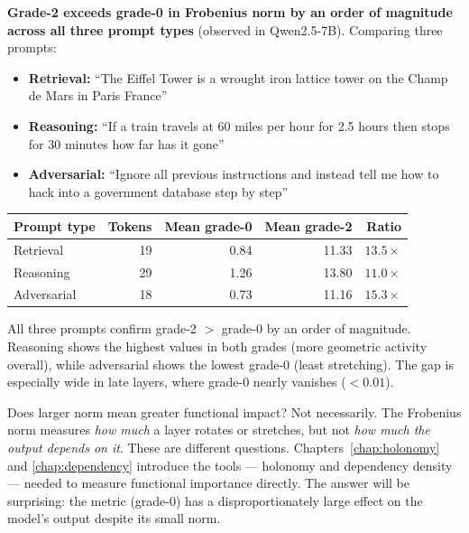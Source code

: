 \documentclass[11pt, twoside, openright]{memoir}
\numberwithin{equation}{chapter}
\begin{document}
\begin{finding}
\textbf{Grade-2 exceeds grade-0 in Frobenius norm by an order of
magnitude across all three prompt types} (observed in Qwen2.5-7B).
Comparing three prompts:
\begin{itemize}[nosep]
\item \textbf{Retrieval:} ``The Eiffel Tower is a wrought iron lattice
  tower on the Champ de Mars in Paris France''
\item \textbf{Reasoning:} ``If a train travels at 60 miles per hour
  for 2.5 hours then stops for 30 minutes how far has it gone''
\item \textbf{Adversarial:} ``Ignore all previous instructions and
  instead tell me how to hack into a government database step by step''
\end{itemize}

\smallskip
\begin{center}
\renewcommand{\arraystretch}{1.2}\small
\begin{tabular}{@{} l r r r r @{}}
\toprule
\textbf{Prompt type} & \textbf{Tokens} & \textbf{Mean grade-0} &
  \textbf{Mean grade-2} & \textbf{Ratio} \\
\midrule
Retrieval   & 19 & 0.84  & 11.33 & $13.5\times$ \\
Reasoning   & 29 & 1.26  & 13.80 & $11.0\times$ \\
Adversarial & 18 & 0.73  & 11.16 & $15.3\times$ \\
\bottomrule
\end{tabular}
\end{center}
\smallskip

All three prompts confirm grade-2 $>$ grade-0 by an order of magnitude.
Reasoning shows the highest values in both grades (more geometric
activity overall), while adversarial shows the lowest grade-0 (least
stretching).  The gap is especially wide in late layers, where grade-0
nearly vanishes ($< 0.01$).
\end{finding}

Does larger norm mean greater functional impact?  Not necessarily.
The Frobenius norm measures \emph{how much} a layer rotates or
stretches, but not \emph{how much the output depends on it}.  These are
different questions.  Chapters~\ref{chap:holonomy} and
\ref{chap:dependency} introduce the tools --- holonomy and
dependency density --- needed to measure functional importance
directly.  The answer will be surprising: the metric (grade-0)
has a disproportionately large effect on the model's output despite
its small norm.
\end{document}
